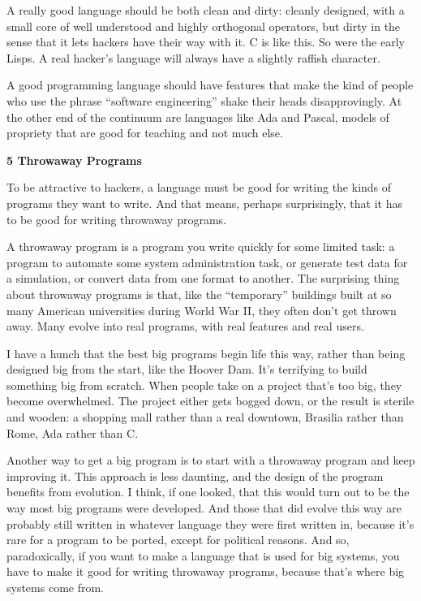 \documentclass[12pt]{book}
\begin{document}
A really good language should be both clean and dirty: cleanly designed,
with a small core of well understood and highly orthogonal operators,
but dirty in the sense that it lets hackers have their way with it. C is
like this. So were the early Lisps. A real hacker's language will always
have a slightly raffish character.

A good programming language should have features that make the kind of
people who use the phrase ``software engineering'' shake their heads
disapprovingly. At the other end of the continuum are languages like Ada
and Pascal, models of propriety that are good for teaching and not much
else.

\textbf{5 Throwaway Programs}

To be attractive to hackers, a language must be good for writing the
kinds of programs they want to write. And that means, perhaps
surprisingly, that it has to be good for writing throwaway programs.

A throwaway program is a program you write quickly for some limited
task: a program to automate some system administration task, or generate
test data for a simulation, or convert data from one format to another.
The surprising thing about throwaway programs is that, like the
``temporary'' buildings built at so many American universities during
World War II, they often don't get thrown away. Many evolve into real
programs, with real features and real users.

I have a hunch that the best big programs begin life this way, rather
than being designed big from the start, like the Hoover Dam. It's
terrifying to build something big from scratch. When people take on a
project that's too big, they become overwhelmed. The project either gets
bogged down, or the result is sterile and wooden: a shopping mall rather
than a real downtown, Brasilia rather than Rome, Ada rather than C.

Another way to get a big program is to start with a throwaway program
and keep improving it. This approach is less daunting, and the design of
the program benefits from evolution. I think, if one looked, that this
would turn out to be the way most big programs were developed. And those
that did evolve this way are probably still written in whatever language
they were first written in, because it's rare for a program to be
ported, except for political reasons. And so, paradoxically, if you want
to make a language that is used for big systems, you have to make it
good for writing throwaway programs, because that's where big systems
come from.
\end{document}
